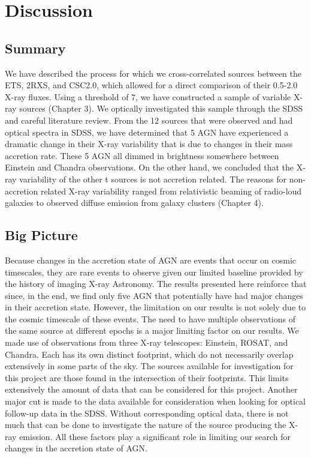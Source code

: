 \chapter{Discussion}
\label{chap5}

\section{Summary}
\label{sub5_1}

We have described the process for which we cross-correlated sources between the ETS, 2RXS, and CSC2.0, which allowed for a direct comparison of their 0.5-2.0 X-ray fluxes. 
Using a threshold of 7, we have constructed a sample of variable X-ray sources (Chapter 3). 
We optically investigated this sample through the SDSS and careful literature review.
From the 12 sources that were observed and had optical spectra in SDSS, we have determined that 5 AGN have experienced a dramatic change in their X-ray variability that is due to changes in their mass accretion rate. 
These 5 AGN all dimmed in brightness somewhere between Einstein and Chandra observations. 
On the other hand,  we concluded that the X-ray variability of the other t sources is not accretion related. 
The reasons for non-accretion related X-ray variability ranged from relativistic beaming of radio-loud galaxies to observed diffuse emission from galaxy clusters (Chapter 4).


\section{Big Picture}
\label{sub5_2}



Because changes in the accretion state of AGN are events that occur on cosmic timescales, they are rare events to observe given our limited baseline provided by the history of imaging X-ray Astronomy. 
The results presented here reinforce that since, in the end, we find only five AGN that potentially have had major changes in their accretion state. 
However, the limitation on our results is not solely due to the cosmic timescale of these events. 
The need to have multiple observations of the same source at different epochs is a major limiting factor on our results. 
We made use of observations from three X-ray telescopes: Einstein, ROSAT, and Chandra. 
Each has its own distinct footprint, which do not necessarily overlap extensively in some parts of the sky. 
The sources available for investigation for this project are those found in the intersection of their footprints. 
This limits extensively the amount of data that can be considered for this project. 
Another major cut is made to the data available for consideration when looking for optical follow-up data in the SDSS. 
Without corresponding optical data, there is not much that can be done to investigate the nature of the source producing the X-ray emission. 
All these factors play a significant role in limiting our search for changes in the accretion state of AGN.

